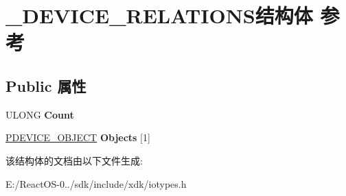 \hypertarget{struct___d_e_v_i_c_e___r_e_l_a_t_i_o_n_s}{}\section{\+\_\+\+D\+E\+V\+I\+C\+E\+\_\+\+R\+E\+L\+A\+T\+I\+O\+N\+S结构体 参考}
\label{struct___d_e_v_i_c_e___r_e_l_a_t_i_o_n_s}
\subsection*{Public 属性}
\begin{DoxyCompactItemize}
\item 
\mbox{\label{struct___d_e_v_i_c_e___r_e_l_a_t_i_o_n_s_ae6f2c67301a27b85880a55760476ead9}} 
U\+L\+O\+NG {\bfseries Count}
\item 
\mbox{\label{struct___d_e_v_i_c_e___r_e_l_a_t_i_o_n_s_afc3c9fe5d49b6b40b125b1dbf068f824}} 
\hyperlink{struct___d_e_v_i_c_e___o_b_j_e_c_t}{P\+D\+E\+V\+I\+C\+E\+\_\+\+O\+B\+J\+E\+CT} {\bfseries Objects} \mbox{[}1\mbox{]}
\end{DoxyCompactItemize}


该结构体的文档由以下文件生成\+:\begin{DoxyCompactItemize}
\item 
E\+:/\+React\+O\+S-\/0../sdk/include/xdk/iotypes.\+h\end{DoxyCompactItemize}
